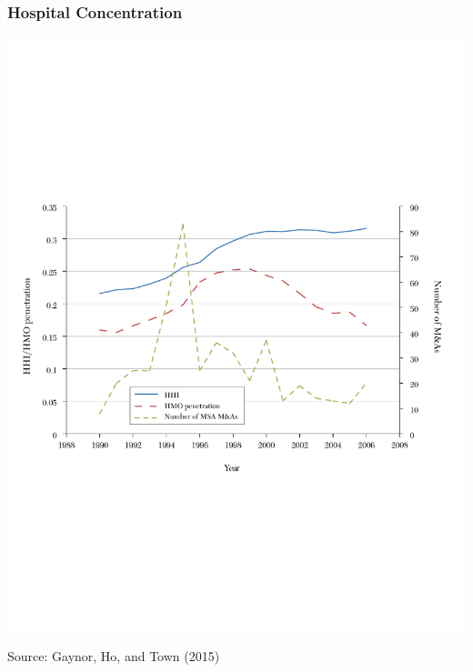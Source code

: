 \documentclass[ucs,9pt]{beamer}
\begin{document}
\begin{frame}
\frametitle{Hospital Concentration}
\begin{center}
\includegraphics[scale=0.5]{gay1}
\end{center}
\tiny Source: Gaynor, Ho, and Town (2015)
\end{frame}
\end{document}
